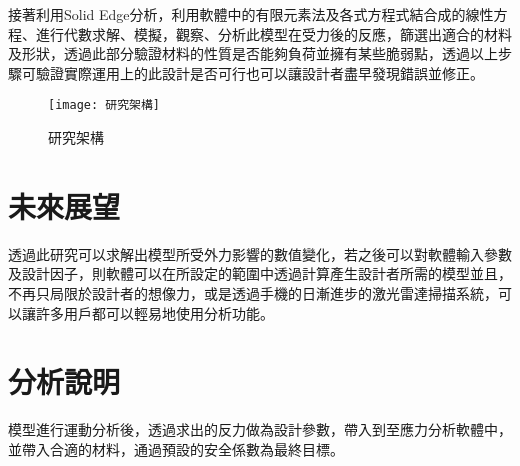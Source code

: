 接著利用Solid Edge分析，利用軟體中的有限元素法及各式方程式結合成的線性方程、進行代數求解、模擬，觀察、分析此模型在受力後的反應，篩選出適合的材料及形狀，透過此部分驗證材料的性質是否能夠負荷並擁有某些脆弱點，透過以上步驟可驗證實際運用上的此設計是否可行也可以讓設計者盡早發現錯誤並修正。\\

\begin{figure}[hbt!]
\begin{center}
\texttt{[image: 研究架構]}
\caption{\Large 研究架構 }
\label{研究架構 }
\end{center}
\end{figure}

\section{未來展望}

透過此研究可以求解出模型所受外力影響的數值變化，若之後可以對軟體輸入參數及設計因子，則軟體可以在所設定的範圍中透過計算產生設計者所需的模型並且，不再只局限於設計者的想像力，或是透過手機的日漸進步的激光雷達掃描系統，可以讓許多用戶都可以輕易地使用分析功能。\\

\section{分析說明}

模型進行運動分析後，透過求出的反力做為設計參數，帶入到至應力分析軟體中，並帶入合適的材料，通過預設的安全係數為最終目標。\\

\renewcommand{\baselinestretch}{0.5} %
